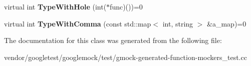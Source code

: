 \begin{DoxyCompactItemize}
\mbox{\label{classtesting_1_1gmock__generated__function__mockers__test_1_1_foo_interface_a9e92ef227dc68806f85ebff9c8a6102a}} 
virtual int {\bfseries Type\+With\+Hole} (int($\ast$func)())=0
\item 
\mbox{\label{classtesting_1_1gmock__generated__function__mockers__test_1_1_foo_interface_a654ade1e68b5adb922149898bfe4ccda}} 
virtual int {\bfseries Type\+With\+Comma} (const std\+::map$<$ int, string $>$ \&a\+\_\+map)=0
\end{DoxyCompactItemize}


The documentation for this class was generated from the following file\+:\begin{DoxyCompactItemize}
\item 
vendor/googletest/googlemock/test/gmock-\/generated-\/function-\/mockers\+\_\+test.\+cc\end{DoxyCompactItemize}
